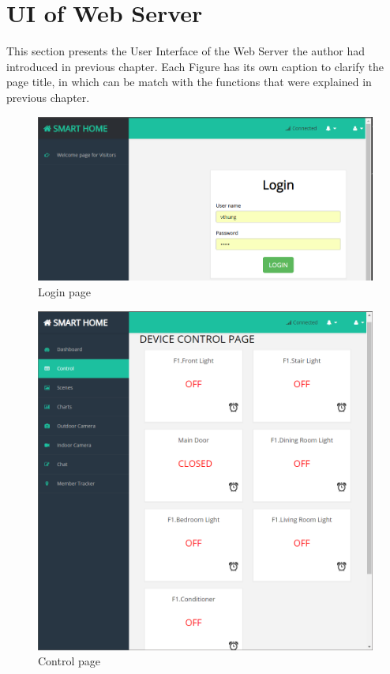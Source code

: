 \section{UI of Web Server}
This section presents the User Interface of the Web Server the author had introduced in previous chapter. Each Figure has its own caption to clarify the page title, in which can be match with the functions that were explained in previous chapter.
\begin{figure}[!ht]
    \begin{center}
    \includegraphics[scale=0.55]{images/login.png}
    \caption{Login page}
    \label{fig:login}
    \end{center}
\end{figure}
\begin{figure}[!h]
    \begin{center}
    \includegraphics[scale=0.4]{images/control.png}
    \caption{Control page}
    \label{fig:control}
    \end{center}
\end{figure}
